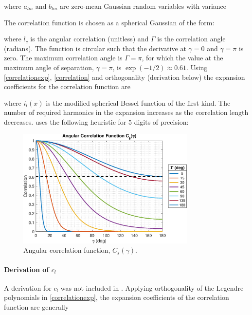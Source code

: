\noindent where $a_{lm}$ and $b_{lm}$ are zero-mean Gaussian random variables with variance 

The correlation function is chosen as a spherical Gaussian of the form:

\noindent where $l_c$ is the angular correlation (unitless) and $\Gamma$ is the correlation angle (radians). The function is circular such that the derivative at $\gamma=0$ and $\gamma=\pi$ is zero. The maximum correlation angle is $\Gamma = \pi$, for which the value at the maximum angle of separation, $\gamma = \pi$, is $\exp(-1/2) \approx 0.61$. Using \eqref{correlationexp}, \eqref{correlation} and orthogonality (derivation below) the expansion coefficients for the correlation function are 

\noindent where $i_l(x)$ is the modified spherical Bessel function of the first kind. The number of required harmonics in the expansion increases as the correlation length decreases.  \cite{muinonen1996light} uses the following heuristic for 5 digits of precision:

\begin{figure}[h] 
   \centering
   \includegraphics[width=3.5in]{RandomObjects/Figures/GaussianParticles/csgamma} 
   \caption{Angular correlation function, $C_s(\gamma)$.}
   \label{}
\end{figure}


\paragraph{Derivation of $c_l$}
A derivation for $c_l$ was not included in \cite{muinonen1996light}.  Applying orthogonality of the Legendre polynomials in \eqref{correlationexp}, the expansion coefficients of the correlation function are generally

